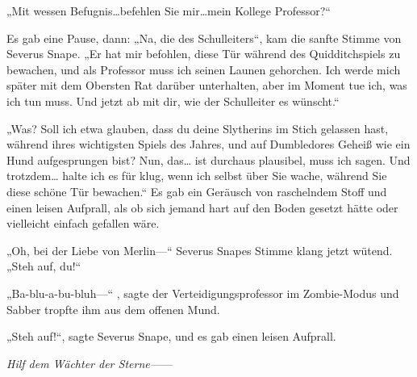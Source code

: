 „Mit wessen Befugnis…befehlen Sie mir…mein Kollege Professor?“

Es gab eine Pause, dann: „Na, die des Schulleiters“, kam die sanfte Stimme von Severus Snape. „Er hat mir befohlen, diese Tür während des Quidditchspiels zu bewachen, und als Professor muss ich seinen Launen gehorchen. Ich werde mich später mit dem Obersten Rat darüber unterhalten, aber im Moment tue ich, was ich tun muss. Und jetzt ab mit dir, wie der Schulleiter es wünscht.“

„Was? Soll ich etwa glauben, dass du deine Slytherins im Stich gelassen hast, während ihres wichtigsten Spiels des Jahres, und auf Dumbledores Geheiß wie ein Hund aufgesprungen bist? Nun, das… ist durchaus plausibel, muss ich sagen. Und trotzdem… halte ich es für klug, wenn ich selbst über Sie wache, während Sie diese schöne Tür bewachen.“
Es gab ein Geräusch von raschelndem Stoff und einen leisen Aufprall, als ob sich jemand hart auf den Boden gesetzt hätte oder vielleicht einfach gefallen wäre.

„Oh, bei der Liebe von Merlin—“ Severus Snapes Stimme klang jetzt wütend. „Steh auf, du!“

„Ba-blu-a-bu-bluh—“ , sagte der Verteidigungsprofessor im Zombie-Modus und Sabber tropfte ihm aus dem offenen Mund.

„Steh auf!“, sagte Severus Snape, und es gab einen leisen Aufprall.

\emph{Hilf dem Wächter der Sterne—}—

